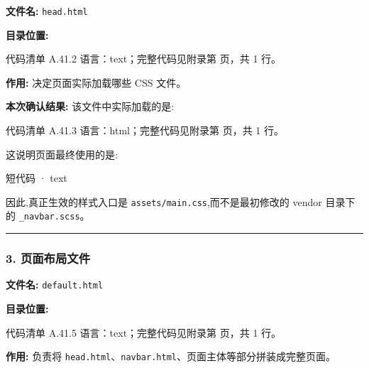 \documentclass[lang=cn,scheme=chinese,color=blue,device=normal,toc=onecol,math=cm]{elegantbook}
\begin{document}
\textbf{文件名:} \texttt{head.html}\par


\textbf{目录位置:}\par


\begin{codeindexbox}{代码清单 A.41.2}
语言：text；完整代码见附录第 \pageref{code:41:2} 页，共 1 行。
\end{codeindexbox}


\textbf{作用:} 决定页面实际加载哪些 CSS 文件。\par


\textbf{本次确认结果:} 该文件中实际加载的是:\par


\begin{codeindexbox}{代码清单 A.41.3}
语言：html；完整代码见附录第 \pageref{code:41:3} 页，共 1 行。
\end{codeindexbox}


这说明页面最终使用的是:\par


\begin{inlinecodebox}{短代码 · text}
\end{inlinecodebox}


因此,真正生效的样式入口是 \texttt{assets/\allowbreak{}main.css},而不是最初修改的 vendor 目录下的 \texttt{\_\allowbreak{}navbar.scss}。\par


\medskip\hrule\medskip


\subsubsection{3. 页面布局文件}


\textbf{文件名:} \texttt{default.html}\par


\textbf{目录位置:}\par


\begin{codeindexbox}{代码清单 A.41.5}
语言：text；完整代码见附录第 \pageref{code:41:5} 页，共 1 行。
\end{codeindexbox}


\textbf{作用:} 负责将 \texttt{head.html}、\texttt{navbar.html}、页面主体等部分拼装成完整页面。\par
\end{document}
